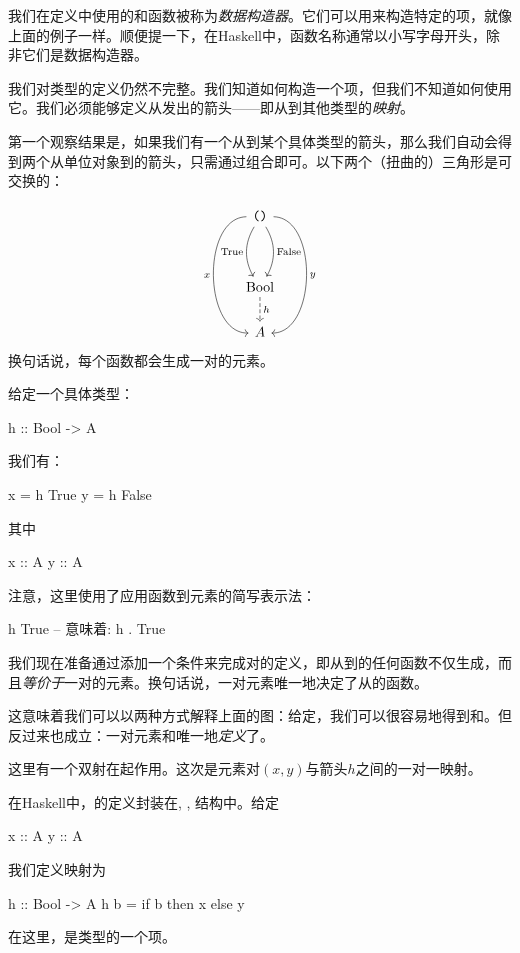 \documentclass[DaoFP]{subfiles}
\begin{document}
 我们在定义中使用的和函数被称为\emph{数据构造器}。它们可以用来构造特定的项，就像上面的例子一样。顺便提一下，在Haskell中，函数名称通常以小写字母开头，除非它们是数据构造器。

 我们对类型的定义仍然不完整。我们知道如何构造一个项，但我们不知道如何使用它。我们必须能够定义从发出的箭头——即从到其他类型的\emph{映射}。

 第一个观察结果是，如果我们有一个从到某个具体类型的箭头，那么我们自动会得到两个从单位对象到的箭头，只需通过组合即可。以下两个（扭曲的）三角形是可交换的：

 \[
  \begin{tikzcd}
   \hask{()}
   \arrow[dd, bend right, "\text{True}"']
   \arrow[dd, bend left, "\text{False}"]
   \arrow[ddd, bend right =90, "x"']
   \arrow[ddd, bend left=90, "y"]
   \\
   \\
   \text{Bool}
   \arrow[d, dashed, "h"]
   \\
   A
  \end{tikzcd}
 \]
 换句话说，每个函数都会生成一对的元素。

 给定一个具体类型：
 \begin{haskell}
  h :: Bool -> A
 \end{haskell}
 我们有：
 \begin{haskell}
  x = h True
  y = h False
 \end{haskell}
 其中
 \begin{haskell}
  x :: A
  y :: A
 \end{haskell}
 注意，这里使用了应用函数到元素的简写表示法：
 \begin{haskell}
  h True -- 意味着: h . True
 \end{haskell}

 我们现在准备通过添加一个条件来完成对的定义，即从到的任何函数不仅生成，而且\emph{等价于}一对的元素。换句话说，一对元素唯一地决定了从的函数。

 这意味着我们可以以两种方式解释上面的图：给定，我们可以很容易地得到和。但反过来也成立：一对元素和唯一地\emph{定义}了。

 这里有一个双射在起作用。这次是元素对$(x, y)$与箭头$h$之间的一对一映射。

 在Haskell中，的定义封装在, , 结构中。给定
 \begin{haskell}
  x :: A
  y :: A
 \end{haskell}
 我们定义映射为
 \begin{haskell}
  h :: Bool -> A
  h b = if b then x else y
 \end{haskell}
 在这里，是类型的一个项。
\end{document}
